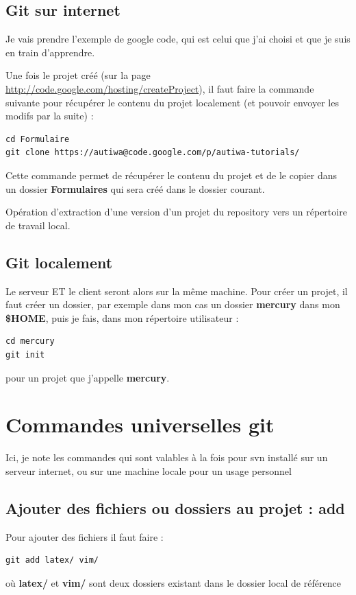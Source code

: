 \documentclass[a4paper,twoside]{article}
\begin{document}
\subsection{Git sur internet}
Je vais prendre l'exemple de google code, qui est celui que j'ai choisi et que je suis en train d'apprendre.


Une fois le projet créé (sur la page \url{http://code.google.com/hosting/createProject}), il faut faire la commande suivante pour récupérer le contenu du projet localement (et pouvoir envoyer les modifs par la suite) : 
\begin{verbatim}
cd Formulaire
git clone https://autiwa@code.google.com/p/autiwa-tutorials/ 
\end{verbatim}

Cette commande permet de récupérer le contenu du projet et de le copier dans un dossier \textbf{Formulaires} qui sera créé dans le dossier courant.

\begin{definition}[Clone]
Opération d'extraction d'une version d'un projet du repository vers un répertoire de travail local.
\end{definition}


\subsection{Git localement}\label{sec:git_init}
Le serveur ET le client seront alors sur la même machine. Pour créer un projet, il faut créer un dossier, par exemple dans mon cas un dossier \textbf{mercury} dans mon \textbf{\$HOME}, puis je fais, dans mon répertoire utilisateur : 
\begin{verbatim}
cd mercury
git init
\end{verbatim}
pour un projet que j'appelle \textbf{mercury}.

\section{Commandes universelles git}
Ici, je note les commandes qui sont valables à la fois pour svn installé sur un serveur internet, ou sur une machine locale pour un usage personnel

\subsection{Ajouter des fichiers ou dossiers au projet : add} 
Pour ajouter des fichiers il faut faire :
\begin{verbatim}
git add latex/ vim/ 
\end{verbatim}
où \textbf{latex/} et \textbf{vim/} sont deux dossiers existant dans le dossier local de référence
\end{document}

